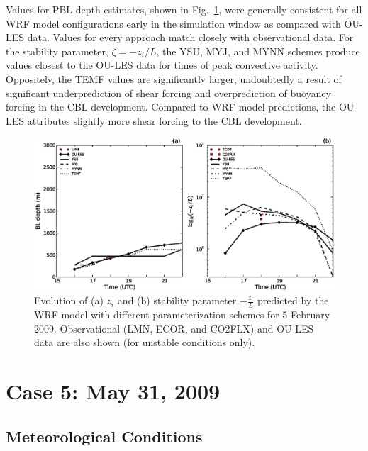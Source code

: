 Values for PBL depth estimates, shown in Fig.~\ref{figure433}, were generally consistent for all WRF model configurations early in the simulation window as compared with OU-LES data. Values for every approach match closely with observational data. For the stability parameter, $\zeta = -z_i / L$, the YSU, MYJ, and MYNN schemes produce values closest to the OU-LES data for times of peak convective activity. Oppositely, the TEMF values are significantly larger, undoubtedly a result of significant underprediction of shear forcing and overprediction of buoyancy forcing in the CBL development. Compared to WRF model predictions, the OU-LES attributes slightly more shear forcing to the CBL development.


\begin{figure}[ht!]
\begin{center}
\includegraphics[width=\textwidth]{figures/chapter4/pblh_phi_phys_20090205}
\end{center}
\caption{Evolution of (a) $z_i$ and (b) stability parameter $-\frac{z_i}{L}$ predicted by the WRF model with different parameterization schemes for 5 February 2009. Observational (LMN, ECOR, and CO2FLX) and OU-LES data are also shown (for unstable conditions only).}
\label{figure433}
\end{figure}


\section{Case 5: May 31, 2009}
\label{may31-47}

\subsection{Meteorological Conditions}
\label{mc-471}


